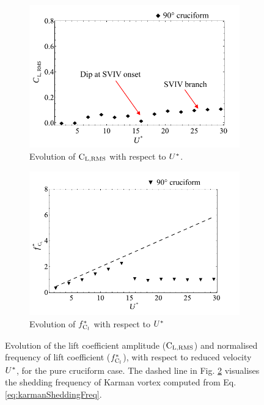 \documentclass[oneside]{utmthesis}
\begin{document}
\begin{figure}[H]
  \centering
  \begin{subfigure}[h]{0.8\textwidth}
    \includegraphics[width=\textwidth]{figs/clRMS5}
    \caption{Evolution of $\text{C}_{\text{L,RMS}}$ with respect to $U^{*}$.}
    \label{fig:clRMS5}
  \end{subfigure}

  \begin{subfigure}[h]{0.8\textwidth}
    \includegraphics[width=\textwidth]{figs/clFreq5}
    \caption{Evolution of $f_{\text{C}_{l}}^{*}$ with respect to $U^{*}$}
    \label{fig:clFreq5}
  \end{subfigure}

  \caption{Evolution of the lift coefficient \rms{} amplitude ($\text{C}_{\text{L,RMS}}$) and normalised frequency of lift coefficient ($f_{\text{C}_{l}}^{*}$), with respect to reduced velocity $U^{*}$, for the pure cruciform case. The dashed line in Fig. \ref{fig:clFreq5} visualises the shedding frequency of Karman vortex computed from Eq. \ref{eq:karmanSheddingFreq}.} \label{fig:cl90}
\end{figure}
\end{document}
